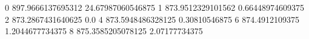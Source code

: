 0 897.9666137695312 24.67987060546875
1 873.9512329101562 0.66448974609375
2 873.2867431640625 0.0
4 873.5948486328125 0.30810546875
6 874.4912109375 1.2044677734375
8 875.3585205078125 2.07177734375
